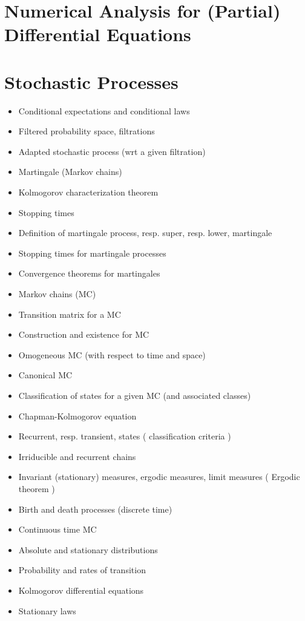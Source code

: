 \documentclass[10pt]{article}
\begin{document}
\section{Numerical Analysis for (Partial) Differential Equations}
\section{Stochastic Processes}
\begin{itemize}
	\item Conditional expectations and conditional laws 
	\item Filtered probability space, filtrations 
	\item Adapted stochastic process (wrt a given filtration) 
	\item Martingale (Markov chains) 
	\item Kolmogorov characterization theorem 
	\item Stopping times 
	\item Definition of martingale process, resp. super, resp. lower, martingale 
	\item Stopping times for martingale processes 
	\item Convergence theorems for martingales 
	\item Markov chains (MC) 
	\item Transition matrix for a MC 
	\item Construction and existence for MC 
	\item Omogeneous MC (with respect to time and space)
	\item Canonical MC 
	\item Classification of states for a given MC (and associated classes) 
	\item Chapman-Kolmogorov equation 
	\item Recurrent, resp. transient, states ( classification criteria ) 
	\item Irriducible and recurrent chains 
	\item Invariant (stationary) measures, ergodic measures, limit measures ( Ergodic theorem ) 
	\item Birth and death processes (discrete time) 
	\item Continuous time MC 
	\item Absolute and stationary distributions 
	\item Probability and rates of transition 
	\item Kolmogorov differential equations 
	\item Stationary laws 

\end{itemize}
\end{document}

